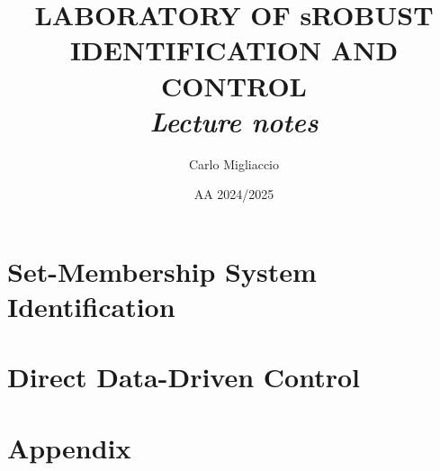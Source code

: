 \documentclass[a4paper, 12pt]{report}
\title{
    {\color{black}
    \textbf{  \Huge{  LABORATORY OF
    sROBUST IDENTIFICATION AND CONTROL } }\\}
    \textit{Lecture notes}
    \linespread{2}
}
\author{Carlo Migliaccio}
\date{AA 2024/2025}
\theoremstyle{definition}
\theoremstyle{remark}
\begin{document}
\maketitle
\tableofcontents


\part{Set-Membership System Identification}






\part{Direct Data-Driven Control}


\part{Appendix}


\end{document}

